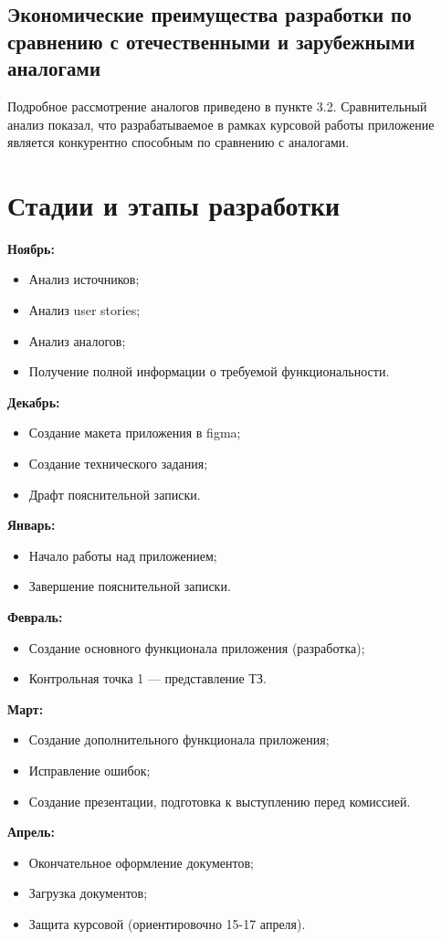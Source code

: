 \documentclass[draft]{article}
\begin{document}
\subsection{Экономические преимущества разработки по сравнению с отечественными и
зарубежными аналогами}
Подробное рассмотрение аналогов приведено в пункте 3.2. Сравнительный анализ показал, что разрабатываемое в рамках курсовой работы приложение является конкурентно способным по сравнению с аналогами.
\newpage
\section {Стадии и этапы разработки}
\textbf{Ноябрь:}
\begin{itemize}
\item Анализ источников;
\item Анализ user stories;
\item Анализ аналогов;
\item Получение полной информации о требуемой функциональности.
\end{itemize}
\textbf{Декабрь:}
\begin{itemize}
\item Создание макета приложения в figma;
\item Создание технического задания;
\item Драфт пояснительной записки.
\end{itemize}
\textbf{Январь:}
\begin{itemize}
\item Начало работы над приложением;
\item Завершение пояснительной записки.
\end{itemize}
\textbf{Февраль:}
\begin{itemize}
\item Создание основного функционала приложения (разработка);
\item Контрольная точка 1 — представление ТЗ.
\end{itemize}
\textbf{Март:}
\begin{itemize}
\item Создание дополнительного функционала приложения;
\item Исправление ошибок;
\item Создание презентации, подготовка к выступлению перед комиссией.
\end{itemize}
\textbf{Апрель:}
\begin{itemize}
\item Окончательное оформление документов;
\item Загрузка документов;
\item Защита курсовой (ориентировочно 15-17 апреля).
\end{itemize}
\newpage
\end{document}
